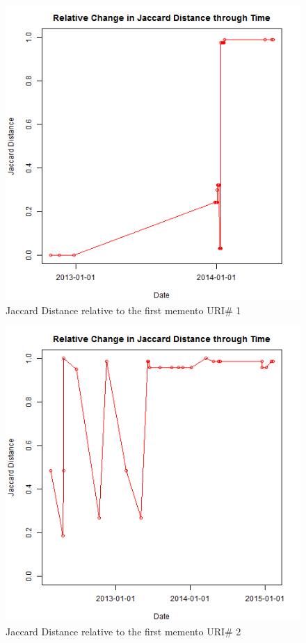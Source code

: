 \begin{figure}[ht]
	\begin{center}
		 \includegraphics[scale=0.60]{url1}
		  \caption{Jaccard Distance relative to the first memento URI\# 1}
	 \end{center}
\end{figure}
\begin{figure}[ht]
	\begin{center}
		 \includegraphics[scale=0.60]{url2}
		  \caption{Jaccard Distance relative to the first memento URI\# 2}
	 \end{center}
\end{figure}
